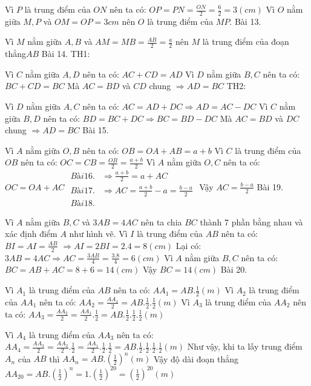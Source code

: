Vì $P$ là trung điểm của $ON$ nên ta có: $OP=PN=\frac{ON}{2}=\frac{6}{2}=3\left( cm \right)$
Vì $O$ nằm giữa $M,P$ và $OM=OP=3cm$ nên $O$ là trung điểm của $MP$.
Bài 13. 

Vì $M$ nằm giữa $A,B$ và $AM=MB=\frac{AB}{2}=\frac{a}{2}$ nên $M$ là trung điểm của đoạn thẳng$AB$
Bài 14. 
TH1: 

Vì $C$ nằm giữa $A,D$ nên ta có: $AC+CD=AD$
Vì $D$ nằm giữa $B,C$ nên ta có: $BC+CD=BC$
Mà $AC=BD$ và $CD$ chung $\Rightarrow AD=BC$
TH2:

Vì $D$ nằm giữa $A,C$ nên ta có: $AC=AD+DC\Rightarrow AD=AC-DC$
Vì $C$ nằm giữa $B,D$ nên ta có: $BD=BC+DC\Rightarrow BC=BD-DC$
Mà $AC=BD$ và $DC$ chung $\Rightarrow AD=BC$
Bài 15. 

Vì $A$ nằm giữa $O,B$ nên ta có: $OB=OA+AB=a+b$
Vì $C$ là trung điểm của $OB$ nên ta có: $OC=CB=\frac{OB}{2}=\frac{a+b}{2}$
Vì $A$ nằm giữa $O,C$ nên ta có: $OC=OA+AC$
$\begin{align}
	Bài 16.   & \Rightarrow \frac{a+b}{2}=a+AC \\ 
	Bài 17.  & \Rightarrow AC=\frac{a+b}{2}-a=\frac{b-a}{2} \\ 
	Bài 18. \end{align}$
Vậy $AC=\frac{b-a}{2}$
Bài 19. 

Vì $A$ nằm giữa $B,C$ và $3AB=4AC$ nên ta chia $BC$ thành 7 phần bằng nhau và xác định điểm $A$ như hình vẽ.
Vì $I$ là trung điểm của $AB$ nên ta có: $BI=AI=\frac{AB}{2}$
$\Rightarrow AI=2BI=2.4=8\left( cm \right)$
Lại có: $3AB=4AC\Rightarrow AC=\frac{3AB}{4}=\frac{3.8}{4}=6\left( cm \right)$
Vì $A$ nằm giữa $B,C$ nên ta có: $BC=AB+AC=8+6=14\left( cm \right)$
Vậy $BC=14\left( cm \right)$
Bài 20. 


Vì ${{A}_{1}}$ là trung điểm của $AB$ nên ta có: $A{{A}_{1}}=AB.\frac{1}{2}\left( m \right)$
Vì ${{A}_{2}}$ là trung điểm của $A{{A}_{1}}$ nên ta có: $A{{A}_{2}}=\frac{A{{A}_{1}}}{2}=AB.\frac{1}{2}.\frac{1}{2}\left( m \right)$
Vì ${{A}_{3}}$ là trung điểm của $A{{A}_{2}}$ nên ta có: $A{{A}_{3}}=\frac{A{{A}_{2}}}{2}=\frac{A{{A}_{1}}}{2}.\frac{1}{2}=AB.\frac{1}{2}.\frac{1}{2}.\frac{1}{2}\left( m \right)$

Vì ${{A}_{4}}$ là trung điểm của $A{{A}_{3}}$ nên ta có: $A{{A}_{4}}=\frac{A{{A}_{3}}}{2}=\frac{A{{A}_{2}}}{2}.\frac{1}{2}=\frac{A{{A}_{1}}}{2}.\frac{1}{2}.\frac{1}{2}=AB.\frac{1}{2}.\frac{1}{2}.\frac{1}{2}.\frac{1}{2}\left( m \right)$
Như vậy, khi ta lấy trung điểm ${{A}_{n}}$ của $AB$ thì $A{{A}_{n}}=AB.{{\left( \frac{1}{2} \right)}^{n}}\left( m \right)$
Vậy độ dài đoạn thẳng $A{{A}_{20}}=AB.{{\left( \frac{1}{2} \right)}^{n}}=1.{{\left( \frac{1}{2} \right)}^{20}}={{\left( \frac{1}{2} \right)}^{20}}\left( m \right)$

